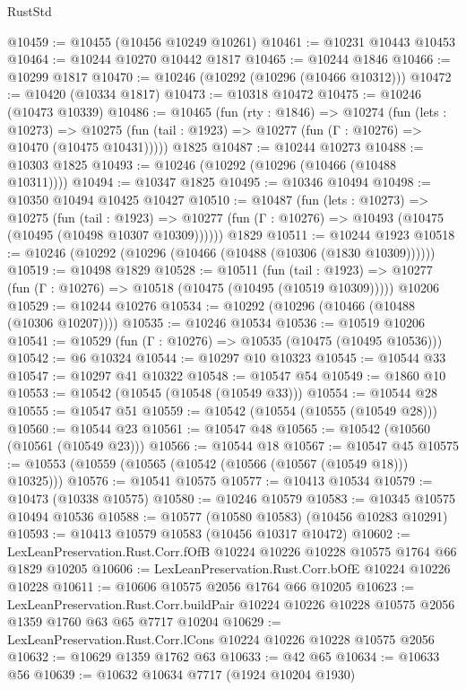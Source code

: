 \begin{lexlean}{RustStd}
\begin{coremodule}
@10459 := @10455 (@10456 @10249 @10261)
@10461 := @10231 @10443 @10453
@10464 := @10244 @10270 @10442 @1817
@10465 := @10244 @1846
@10466 := @10299 @1817
@10470 := @10246 (@10292 (@10296 (@10466 @10312)))
@10472 := @10420 (@10334 @1817)
@10473 := @10318 @10472
@10475 := @10246 (@10473 @10339)
@10486 := @10465
    (fun (rty : @1846) =>
    @10274
      (fun (lets : @10273) =>
      @10275 (fun (tail : @1923) => @10277 (fun (Γ : @10276) => @10470 (@10475 @10431)))))
    @1825
@10487 := @10244 @10273
@10488 := @10303 @1825
@10493 := @10246 (@10292 (@10296 (@10466 (@10488 @10311))))
@10494 := @10347 @1825
@10495 := @10346 @10494
@10498 := @10350 @10494 @10425 @10427
@10510 := @10487
    (fun (lets : @10273) =>
    @10275
      (fun (tail : @1923) =>
      @10277 (fun (Γ : @10276) => @10493 (@10475 (@10495 (@10498 @10307 @10309))))))
    @1829
@10511 := @10244 @1923
@10518 := @10246 (@10292 (@10296 (@10466 (@10488 (@10306 (@1830 @10309))))))
@10519 := @10498 @1829
@10528 := @10511
    (fun (tail : @1923) => @10277 (fun (Γ : @10276) => @10518 (@10475 (@10495 (@10519 @10309)))))
    @10206
@10529 := @10244 @10276
@10534 := @10292 (@10296 (@10466 (@10488 (@10306 @10207))))
@10535 := @10246 @10534
@10536 := @10519 @10206
@10541 := @10529 (fun (Γ : @10276) => @10535 (@10475 (@10495 @10536)))
@10542 := @6 @10324
@10544 := @10297 @10 @10323
@10545 := @10544 @33
@10547 := @10297 @41 @10322
@10548 := @10547 @54
@10549 := @1860 @10
@10553 := @10542 (@10545 (@10548 (@10549 @33)))
@10554 := @10544 @28
@10555 := @10547 @51
@10559 := @10542 (@10554 (@10555 (@10549 @28)))
@10560 := @10544 @23
@10561 := @10547 @48
@10565 := @10542 (@10560 (@10561 (@10549 @23)))
@10566 := @10544 @18
@10567 := @10547 @45
@10575 := @10553 (@10559 (@10565 (@10542 (@10566 (@10567 (@10549 @18))) @10325)))
@10576 := @10541 @10575
@10577 := @10413 @10534
@10579 := @10473 (@10338 @10575)
@10580 := @10246 @10579
@10583 := @10345 @10575 @10494 @10536
@10588 := @10577 (@10580 @10583) (@10456 @10283 @10291)
@10593 := @10413 @10579 @10583 (@10456 @10317 @10472)
@10602 := LexLeanPreservation.Rust.Corr.fOfB @10224 @10226 @10228 @10575 @1764 @66 @1829 @10205
@10606 := LexLeanPreservation.Rust.Corr.bOfE @10224 @10226 @10228
@10611 := @10606 @10575 @2056 @1764 @66 @10205
@10623 := LexLeanPreservation.Rust.Corr.buildPair
    @10224
    @10226
    @10228
    @10575
    @2056
    @1359
    @1760
    @63
    @65
    @7717
    @10204
@10629 := LexLeanPreservation.Rust.Corr.lCons @10224 @10226 @10228 @10575 @2056
@10632 := @10629 @1359 @1762 @63
@10633 := @42 @65
@10634 := @10633 @56
@10639 := @10632 @10634 @7717 (@1924 @10204 @1930)

\end{coremodule}
\end{lexlean}
